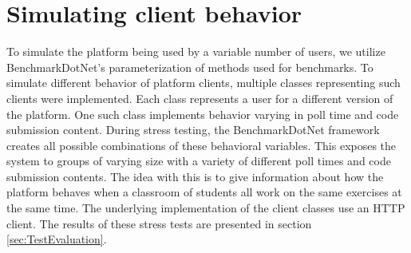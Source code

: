 
\section{Simulating client behavior}
To simulate the platform being used by a variable number of users, we utilize BenchmarkDotNet's parameterization of methods used for benchmarks. 
To simulate different behavior of platform clients, multiple classes representing such clients were implemented.
Each class represents a user for a different version of the platform.
One such class implements behavior varying in poll time and code submission content.
During stress testing, the BenchmarkDotNet framework creates all possible combinations of these behavioral variables.
This exposes the system to groups of varying size with a variety of different poll times and code submission contents.
The idea with this is to give information about how the platform behaves when a classroom of students all work on the same exercises at the same time.
The underlying implementation of the client classes use an HTTP client.
The results of these stress tests are presented in section \ref{sec:TestEvaluation}.